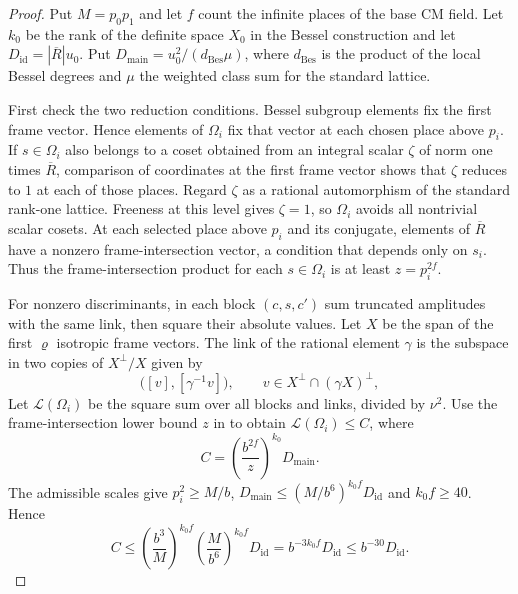 \begin{proof}
Put $M=p_0p_1$ and let $f$ count the infinite places of the base CM field. Let $k_0$ be the rank of the
definite space $X_0$ in the Bessel construction and let $D_{\mathrm{id}}=|\overline R|u_0$.
Put $D_{\mathrm{main}}=u_0^2/(d_{\mathrm{Bes}}\mu)$,
where $d_{\mathrm{Bes}}$ is the product of the local Bessel degrees and $\mu$ the weighted class sum for the standard lattice.

First check the two reduction conditions. Bessel subgroup elements fix the first frame vector.
Hence elements of $\Omega_i$ fix that vector at each chosen place above $p_i$.
If $s\in\Omega_i$ also belongs to a coset obtained from an integral scalar
$\zeta$ of norm one times $\overline R$, comparison of coordinates at the first frame vector shows that
$\zeta$ reduces to $1$ at each of those places.
Regard $\zeta$ as a rational automorphism of the standard rank-one lattice.
Freeness at this level gives $\zeta=1$, so $\Omega_i$ avoids all nontrivial scalar cosets.
At each selected place above $p_i$ and its conjugate, elements of $\overline R$
have a nonzero frame-intersection vector, a condition that depends only on $s_i$.
Thus the frame-intersection product for each $s\in\Omega_i$ is at least
$z=p_i^{2f}$.

For nonzero discriminants, in each block $(c,s,c')$
sum truncated amplitudes with the same link, then square their absolute values.
Let $X$ be the span of the first $\varrho$ isotropic frame vectors.
The link of the rational element $\gamma$ is the subspace in two copies of $X^\perp/X$ given by
\[
 \bigl([v],[\gamma^{-1}v]\bigr),\qquad v\in X^\perp\cap(\gamma X)^\perp,
\]
Let $\mathcal L(\Omega_i)$ be the square sum over all blocks and links, divided by $\nu^2$.
Use the frame-intersection lower bound $z$ in  to obtain
$\mathcal L(\Omega_i)\le C$, where
\[
 C=\left(\frac{b^{2f}}{z}\right)^{k_0}D_{\mathrm{main}} .
\]
The admissible scales give $p_i^2\ge M/b$,
$D_{\mathrm{main}}\le(M/b^6)^{k_0 f}D_{\mathrm{id}}$
and $k_0 f\ge40$. Hence
\[
 C\le\left(\frac{b^3}{M}\right)^{k_0 f}
        \left(\frac{M}{b^6}\right)^{k_0 f}D_{\mathrm{id}}
   =b^{-3k_0 f}D_{\mathrm{id}}
   \le b^{-30}D_{\mathrm{id}} .
\]


\end{proof}
